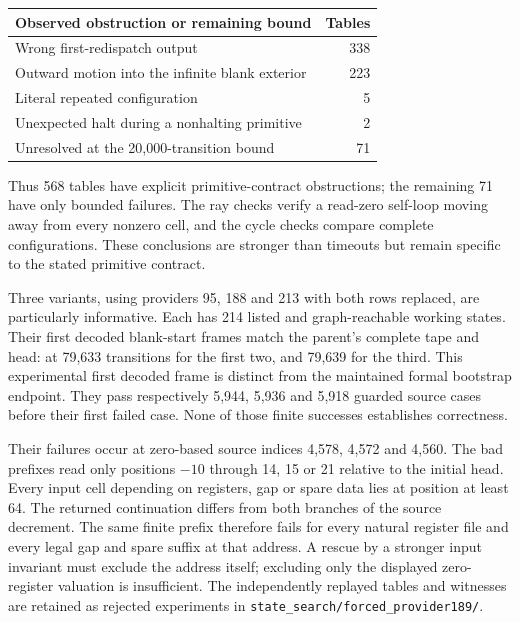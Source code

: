 \begin{center}
\begin{tabular}{lr}
\toprule
Observed obstruction or remaining bound & Tables\\\midrule
Wrong first-redispatch output & 338\\
Outward motion into the infinite blank exterior & 223\\
Literal repeated configuration & 5\\
Unexpected halt during a nonhalting primitive & 2\\
Unresolved at the 20,000-transition bound & 71\\\bottomrule
\end{tabular}
\end{center}

Thus 568 tables have explicit primitive-contract obstructions; the remaining
71 have only bounded failures. The ray checks verify a read-zero self-loop
moving away from every nonzero cell, and the cycle checks compare complete
configurations. These conclusions are stronger than timeouts but remain
specific to the stated primitive contract.

Three variants, using providers 95, 188 and 213 with both rows replaced, are
particularly informative. Each has 214 listed and graph-reachable working
states. Their first decoded blank-start frames match the parent's complete
tape and head: at 79,633 transitions for the first two, and 79,639 for the
third. This experimental first decoded frame is distinct from the maintained
formal bootstrap endpoint. They pass respectively 5,944, 5,936 and 5,918
guarded source cases before their first failed case. None of those finite
successes establishes correctness.

Their failures occur at zero-based source indices 4,578, 4,572 and 4,560.
The bad prefixes read only positions $-10$ through 14, 15 or 21 relative to
the initial head. Every input cell depending on registers, gap or spare data
lies at position at least 64. The returned continuation differs from both
branches of the source decrement. The same finite prefix therefore fails for
every natural register file and every legal gap and spare suffix at that
address. A rescue by a stronger input invariant must exclude the address
itself; excluding only the displayed zero-register valuation is insufficient.
The independently replayed tables and witnesses are retained as rejected
experiments in \texttt{state\_search/forced\_provider189/}.

